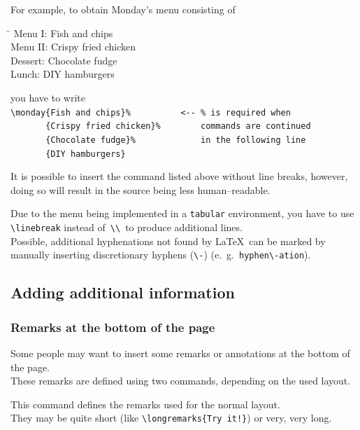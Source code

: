 \documentclass[11pt]{ltxdoc}
\begin{document}
	For example, to obtain Monday's menu consisting of
	\begin{multicols}{2}
		\begin{tabbing}
			\hspace{2cm}\=\kill
			Menu I:		\> Fish and chips \\
			Menu II:	\> Crispy fried chicken \\
			Dessert:	\> Chocolate fudge \\
			Lunch:		\> DIY hamburgers
		\end{tabbing}
	\end{multicols}
	you have to write \\
	\verb|\monday{Fish and chips}%          <-- % is required when| \\\nopagebreak[4]
	\verb|       {Crispy fried chicken}%        commands are continued| \\\nopagebreak[4]
	\verb|       {Chocolate fudge}%             in the following line| \\\nopagebreak[4]
	\verb|       {DIY hamburgers}|
	
	\smallskip
	It is possible to insert the command listed above without line breaks, however, doing so will result in the source being less human--readable.
	
	\smallskip
	Due to the menu being implemented in a \texttt{tabular} environment, you have to use \verb|\linebreak| instead of \,\verb|\\|\, to produce additional lines. \\
	Possible, additional hyphenations not found by \LaTeX\ can be marked by manually inserting discretionary hyphens (\verb|\-|) (e.~g.~\verb|hyphen\-ation|).
	
	
	\subsection{Adding additional information}
	\subsubsection{Remarks at the bottom of the page} \label{sec:remarks}
	Some people may want to insert some remarks or annotations at the bottom of the page. \\
	These remarks are defined using two commands, depending on the used layout.
	
	\medskip
	\DescribeMacro{\longremarks}
	This command defines the remarks used for the normal layout. \\
	They may be quite short (like \verb|\longremarks{Try it!}|) or very, very long.
	
\end{document}

